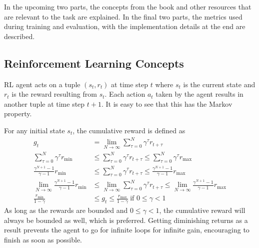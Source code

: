 \documentclass{article}
\begin{document}
In the upcoming two parts, the concepts from the book and other resources that are relevant to the task are explained. In the final two parts, the metrics used during training and evaluation, with the implementation details at the end are described.
\subsection{Reinforcement Learning Concepts}
RL agent acts on a tuple $(s_t,r_t)$ at time step $t$ where $s_t$ is the current state and $r_t$ is the reward resulting from $s_t$. Each action $a_t$ taken by the agent results in another tuple at time step $t+1$. It is easy to see that this has the Markov property.

For any initial state $s_t$, the cumulative reward is defined as
\begin{align}
    g_t &= \lim_{N\rightarrow\infty}\sum_{\tau=0}^N \gamma^\tau r_{t+\tau}\\
    \sum_{\tau=0}^N \gamma^\tau r_{\min} &\leq\sum_{\tau=0}^N \gamma^\tau r_{t+\tau}\leq\sum_{\tau=0}^N \gamma^\tau r_{\max}\\
    \frac{\gamma^{N+1}-1}{\gamma-1}r_{\min} &\leq\sum_{\tau=0}^N \gamma^\tau r_{t+\tau}\leq\frac{\gamma^{N+1}-1}{\gamma-1}r_{\max}\\
    \lim_{N\rightarrow\infty}\frac{\gamma^{N+1}-1}{\gamma-1}r_{\min} &\leq\lim_{N\rightarrow\infty}\sum_{\tau=0}^N \gamma^\tau r_{t+\tau}\leq\lim_{N\rightarrow\infty}\frac{\gamma^{N+1}-1}{\gamma-1}r_{\max}\\
    \frac{r_{\min}}{1-\gamma} &\leq g_t\leq\frac{r_{\max}}{1-\gamma}\ \scriptstyle{\text{if $0 \leq \gamma < 1$}}
\end{align}
As long as the rewards are bounded and $0 \leq \gamma < 1$, the cumulative reward will always be bounded as well, which is preferred. Getting diminishing returns as a result prevents the agent to go for infinite loops for infinite gain, encouraging to finish as soon as possible.
\end{document}
